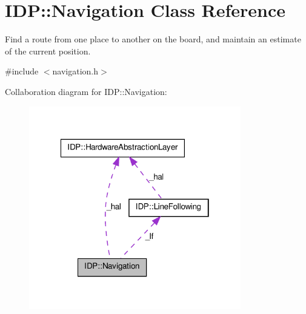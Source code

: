 \hypertarget{classIDP_1_1Navigation}{
\section{IDP::Navigation Class Reference}
\label{classIDP_1_1Navigation}
}


Find a route from one place to another on the board, and maintain an estimate of the current position.  




{\ttfamily \#include $<$navigation.h$>$}



Collaboration diagram for IDP::Navigation:\nopagebreak
\begin{figure}[H]
\begin{center}
\leavevmode
\includegraphics[width=262pt]{classIDP_1_1Navigation__coll__graph}
\end{center}
\end{figure}
